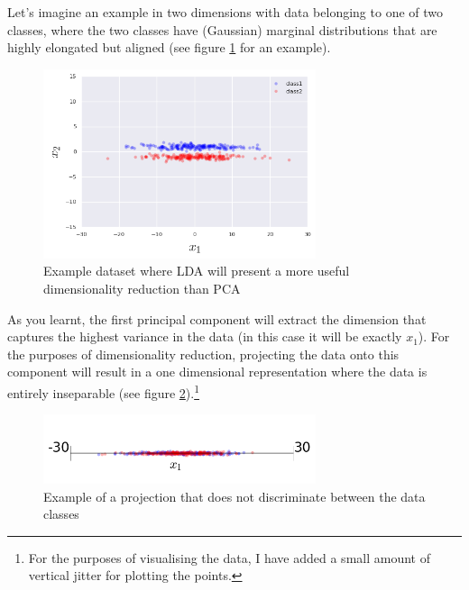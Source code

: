 \documentclass{article}
\begin{document}
Let's imagine an example in two dimensions with data belonging to one of two classes, where the two classes have (Gaussian) marginal distributions that are highly elongated but aligned (see figure \ref{fig:lda_vs_pcs_ex} for an example).
\begin{figure}[h]
\center
\includegraphics[width=8cm]{lda_vs_pcs_ex}
\caption{Example dataset where LDA will present a more useful dimensionality reduction than PCA}\label{fig:lda_vs_pcs_ex}
\end{figure}
As you learnt, the first principal component will extract the dimension that captures the highest variance in the data (in this case it will be exactly $x_1$). For the purposes of dimensionality reduction, projecting the data onto this component will result in a one dimensional representation where the data is entirely inseparable (see figure \ref{fig:pca_projection}).\footnote{For the purposes of visualising the data, I have added a small amount of vertical jitter for plotting the points.}

\begin{figure}[h]
\center
\includegraphics[width=8cm]{pca_projection}
\caption{Example of a projection that does not discriminate between the data classes}\label{fig:pca_projection}
\end{figure}
\end{document}
